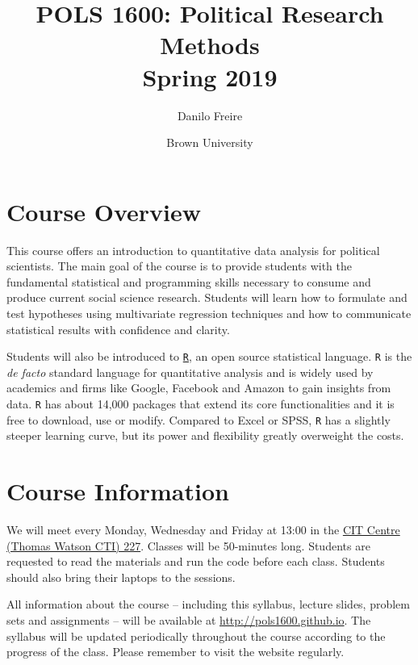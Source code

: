 \documentclass[a4paper,12pt]{article}
\title{\textbf{POLS 1600: Political Research Methods \\ \Large{Spring 2019}}}
\author{Danilo Freire}
\date{Brown University}
\begin{document}
\maketitle

\section{Course Overview}%
\label{sec:overview}

This course offers an introduction to quantitative data analysis for political scientists. The main goal of the course is to provide students with the fundamental statistical and programming skills necessary to consume and produce current social science research. Students will learn how to formulate and test hypotheses using multivariate regression techniques and how to communicate statistical results with confidence and clarity.

Students will also be introduced to \href{https://en.wikipedia.org/wiki/R_(programming_language)}{\texttt{R}}, an open source statistical language. \texttt{R} is the \textit{de facto} standard language for quantitative analysis and is widely used by academics and firms like Google, Facebook and Amazon to gain insights from data. \texttt{R} has about 14,000 packages that extend its core functionalities and it is free to download, use or modify. Compared to Excel or SPSS, \texttt{R} has a slightly steeper learning curve, but its power and flexibility greatly overweight the costs.

\section{Course Information}%
\label{sec:course_information}

We will meet every Monday, Wednesday and Friday at 13:00 in the \href{http://brown.edu/Facilities/Facilities_Management/maps/index.php#building/WATSONCIT}{CIT Centre (Thomas Watson CTI) 227}. Classes will be 50-minutes long. Students are requested to read the materials and run the code before each class. Students should also bring their laptops to the sessions.

All information about the course -- including this syllabus, lecture slides, problem sets and assignments -- will be available at \href{http://pols1600.github.io}{http://pols1600.github.io}. The syllabus will be updated periodically throughout the course according to the progress of the class. Please remember to visit the website regularly.
\end{document}

